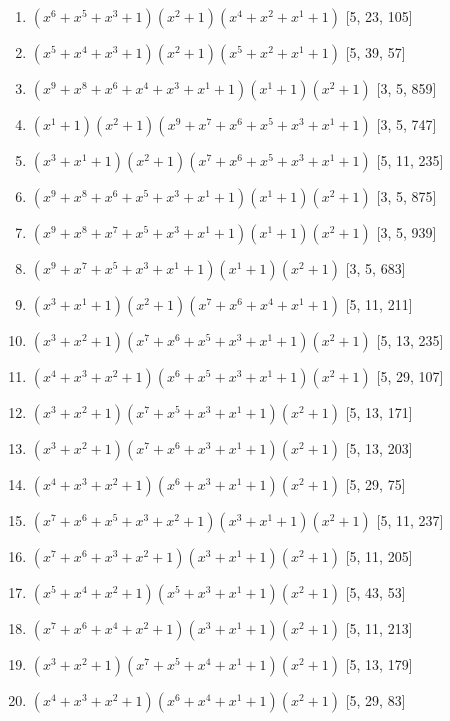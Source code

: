 \documentclass[10pt,twocolumn]{article}
\begin{document}
\begin{enumerate}
\item $(x^{6} + x^{5} + x^{3} + 1)(x^{2} + 1)(x^{4} + x^{2} + x^{1} + 1)$  [5, 23, 105]
\item $(x^{5} + x^{4} + x^{3} + 1)(x^{2} + 1)(x^{5} + x^{2} + x^{1} + 1)$  [5, 39, 57]
\item $(x^{9} + x^{8} + x^{6} + x^{4} + x^{3} + x^{1} + 1)(x^{1} + 1)(x^{2} + 1)$  [3, 5, 859]
\item $(x^{1} + 1)(x^{2} + 1)(x^{9} + x^{7} + x^{6} + x^{5} + x^{3} + x^{1} + 1)$  [3, 5, 747]
\item $(x^{3} + x^{1} + 1)(x^{2} + 1)(x^{7} + x^{6} + x^{5} + x^{3} + x^{1} + 1)$  [5, 11, 235]
\item $(x^{9} + x^{8} + x^{6} + x^{5} + x^{3} + x^{1} + 1)(x^{1} + 1)(x^{2} + 1)$  [3, 5, 875]
\item $(x^{9} + x^{8} + x^{7} + x^{5} + x^{3} + x^{1} + 1)(x^{1} + 1)(x^{2} + 1)$  [3, 5, 939]
\item $(x^{9} + x^{7} + x^{5} + x^{3} + x^{1} + 1)(x^{1} + 1)(x^{2} + 1)$  [3, 5, 683]
\item $(x^{3} + x^{1} + 1)(x^{2} + 1)(x^{7} + x^{6} + x^{4} + x^{1} + 1)$  [5, 11, 211]
\item $(x^{3} + x^{2} + 1)(x^{7} + x^{6} + x^{5} + x^{3} + x^{1} + 1)(x^{2} + 1)$  [5, 13, 235]
\item $(x^{4} + x^{3} + x^{2} + 1)(x^{6} + x^{5} + x^{3} + x^{1} + 1)(x^{2} + 1)$  [5, 29, 107]
\item $(x^{3} + x^{2} + 1)(x^{7} + x^{5} + x^{3} + x^{1} + 1)(x^{2} + 1)$  [5, 13, 171]
\item $(x^{3} + x^{2} + 1)(x^{7} + x^{6} + x^{3} + x^{1} + 1)(x^{2} + 1)$  [5, 13, 203]
\item $(x^{4} + x^{3} + x^{2} + 1)(x^{6} + x^{3} + x^{1} + 1)(x^{2} + 1)$  [5, 29, 75]
\item $(x^{7} + x^{6} + x^{5} + x^{3} + x^{2} + 1)(x^{3} + x^{1} + 1)(x^{2} + 1)$  [5, 11, 237]
\item $(x^{7} + x^{6} + x^{3} + x^{2} + 1)(x^{3} + x^{1} + 1)(x^{2} + 1)$  [5, 11, 205]
\item $(x^{5} + x^{4} + x^{2} + 1)(x^{5} + x^{3} + x^{1} + 1)(x^{2} + 1)$  [5, 43, 53]
\item $(x^{7} + x^{6} + x^{4} + x^{2} + 1)(x^{3} + x^{1} + 1)(x^{2} + 1)$  [5, 11, 213]
\item $(x^{3} + x^{2} + 1)(x^{7} + x^{5} + x^{4} + x^{1} + 1)(x^{2} + 1)$  [5, 13, 179]
\item $(x^{4} + x^{3} + x^{2} + 1)(x^{6} + x^{4} + x^{1} + 1)(x^{2} + 1)$  [5, 29, 83]

\end{enumerate}
\end{document}
